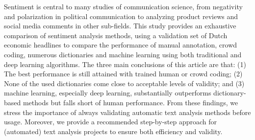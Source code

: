 Sentiment is central to many studies of communication science, from negativity and polarization in political communication to analyzing product reviews and social media comments in other sub-fields. 
This study provides an exhaustive comparison of sentiment analysis methods, using a 
validation set of Dutch economic headlines
to compare the performance of manual annotation, crowd coding, numerous 
dictionaries and machine learning using both traditional and deep learning algorithms. 
The three main conclusions of this article are that: 
(1) The best performance is still attained with trained human or crowd coding;
(2) None of the used dictionaries come close to acceptable levels of validity; and 
(3) machine learning, especially deep learning, substantially outperforms dictionary-based methods but falls short of human performance.
From these findings, we stress the importance of always validating automatic text analysis 
methods before usage.
Moreover, we provide a recommended step-by-step approach for (automated) text analysis projects to ensure both efficiency and validity. 
